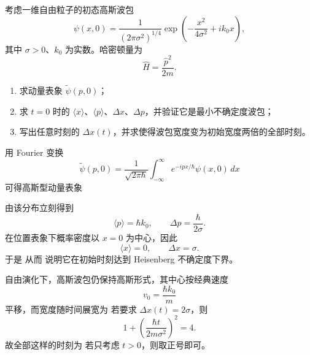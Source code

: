 \begin{question}
考虑一维自由粒子的初态高斯波包
\[
\psi(x,0)=\frac{1}{(2\pi\sigma^2)^{1/4}}\exp\left(-\frac{x^2}{4\sigma^2}+ik_0x\right),
\]
其中 $\sigma>0$、$k_0$ 为实数。哈密顿量为
\[
\hat H=\frac{\hat p^2}{2m}.
\]

\begin{enumerate}[label=(\arabic*),leftmargin=2.5em]
  \item 求动量表象 $\tilde\psi(p,0)$；
  \item 求 $t=0$ 时的 $\langle x\rangle$、$\langle p\rangle$、$\Delta x$、$\Delta p$，并验证它是最小不确定度波包；
  \item 写出任意时刻的 $\Delta x(t)$，并求使得波包宽度变为初始宽度两倍的全部时刻。
\end{enumerate}

\begin{solution}
用 Fourier 变换
\[
\tilde\psi(p,0)=\frac{1}{\sqrt{2\pi\hbar}}\int_{-\infty}^{\infty}e^{-ipx/\hbar}\psi(x,0)\,dx
\]
可得高斯型动量表象

由该分布立刻得到
\[
\langle p\rangle=\hbar k_0,
\qquad
\Delta p=\frac{\hbar}{2\sigma}.
\]
在位置表象下概率密度以 $x=0$ 为中心，因此
\[
\langle x\rangle=0,
\qquad
\Delta x=\sigma.
\]
于是
从而
说明它在初始时刻达到 Heisenberg 不确定度下界。

自由演化下，高斯波包仍保持高斯形式，其中心按经典速度
\[
v_0=\frac{\hbar k_0}{m}
\]
平移，而宽度随时间展宽为
若要求 $\Delta x(t)=2\sigma$，则
\[
1+\left(\frac{\hbar t}{2m\sigma^2}\right)^2=4.
\]
故全部这样的时刻为
若只考虑 $t>0$，则取正号即可。
\end{solution}
\end{question}

